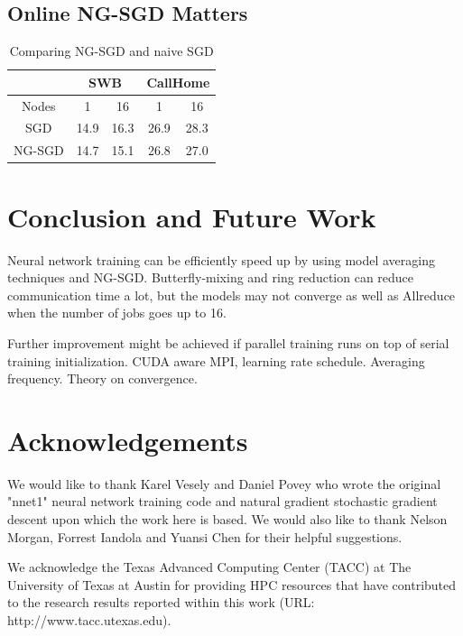 \documentclass{article}
\begin{document}
\subsection{Online NG-SGD Matters}
\begin{table}
  \centering
  \begin{tabular}{c|c|c|c|c}
    \hline
    & \multicolumn{2}{c|}{SWB}  & \multicolumn{2}{c}{CallHome} \\
    \hline
     Nodes  &  1    & 16        &   1   &  16 \\
    \hline
    SGD     & 14.9    & 16.3    &  26.9 & 28.3 \\
    \hline
    NG-SGD  & 14.7    & 15.1    &  26.8 & 27.0  \\
    \hline
  \end{tabular}
  \caption{Comparing NG-SGD and naive SGD}
  \label{tab:ngsgd}
\end{table}

\section{Conclusion and Future Work}
Neural network training can be efficiently speed up by using model averaging techniques and NG-SGD. 
Butterfly-mixing and ring reduction can reduce communication time a lot, but the models may not converge as well as 
Allreduce when the number of jobs goes up to 16.

Further improvement might be achieved if parallel training runs on top of serial training initialization.
CUDA aware MPI, learning rate schedule. Averaging frequency. Theory on convergence.

\section{Acknowledgements}
We would like to thank Karel Vesely and Daniel Povey who wrote the original "nnet1" neural network training code
and natural gradient stochastic gradient descent upon which the work here is based. We would also like to thank Nelson 
Morgan, Forrest Iandola and Yuansi Chen for their helpful suggestions. 

We acknowledge the Texas Advanced Computing Center (TACC) at The University of Texas at Austin for providing 
HPC resources that have contributed to the research results reported within this work (URL: http://www.tacc.utexas.edu).



\end{document}
